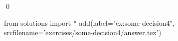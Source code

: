 
\begin{ex} 
  \label{ex:some-decision4}
  
  \qed
\end{ex} 
\begin{python0}
from solutions import *
add(label="ex:some-decision4",
    srcfilename='exercises/some-decision4/answer.tex') 
\end{python0}
